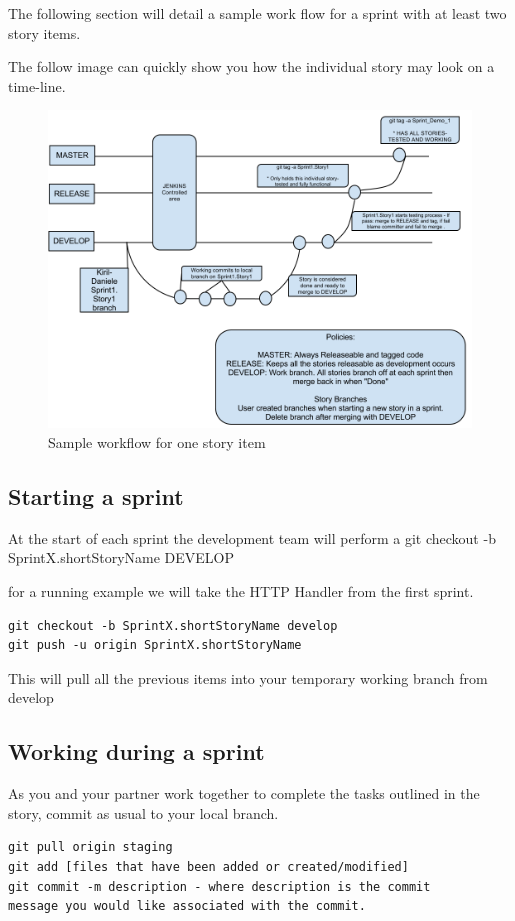 The following section will detail a sample work flow for a sprint with at least two story items. 

The follow image can quickly show you how the individual story may look on a time-line.
\begin{figure}[htb]
\centering
\includegraphics[width=1\textwidth]{img/workflow}
\caption{Sample workflow for one story item}
\label{fig:architecture}
\end{figure}


\subsection{Starting a sprint}

At the start of each sprint the development team will perform a git checkout -b SprintX.shortStoryName DEVELOP

for a running example we will take the HTTP Handler from the first sprint. 
\begin{verbatim}
git checkout -b SprintX.shortStoryName develop
git push -u origin SprintX.shortStoryName
\end{verbatim}
This will pull all the previous items into your temporary working branch from develop

\subsection{Working during a sprint}

As you and your partner work together to complete the tasks outlined in the story, commit as usual to your local branch.\\
\begin{verbatim}
git pull origin staging
git add [files that have been added or created/modified]
git commit -m description - where description is the commit 
message you would like associated with the commit. 
\end{verbatim}
